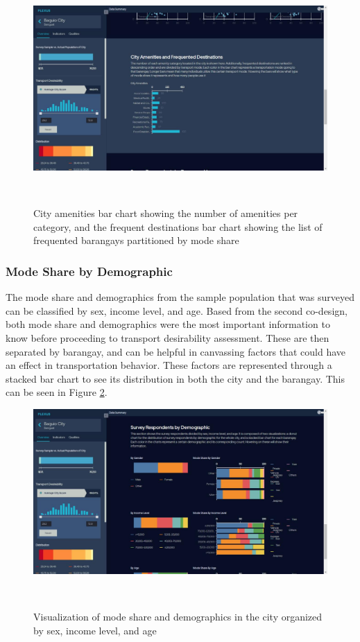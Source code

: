 \documentclass{sigchi}
\begin{document}
\begin{figure}
\centering
  \includegraphics[width=0.9\columnwidth]{figures/latest-screens/amenities.jpg}
  \caption{City amenities bar chart showing the number of amenities per category, and the frequent destinations bar chart showing the list of frequented barangays partitioned by mode share}~\label{fig:KeplerAmenitiyModeShare}
\end{figure}

\subsubsection{Mode Share by Demographic}
The mode share and demographics from the sample population that was surveyed can be classified by sex, income level, and age. Based from the second co-design, both mode share and demographics were the most important information to know before proceeding to transport desirability assessment. These are then separated by barangay, and can be helpful in canvassing factors that could have an effect in transportation behavior. These factors are represented through a stacked bar chart to see its distribution in both the city and the barangay. This can be seen in Figure \ref{fig:KeplerSurveyShare}.

\begin{figure}
\centering
  \includegraphics[width=0.9\columnwidth]{figures/latest-screens/modeshare.jpg}
  \caption{Visualization of mode share and demographics in the city organized by sex, income level, and age}~\label{fig:KeplerSurveyShare}
\end{figure}
\end{document}
